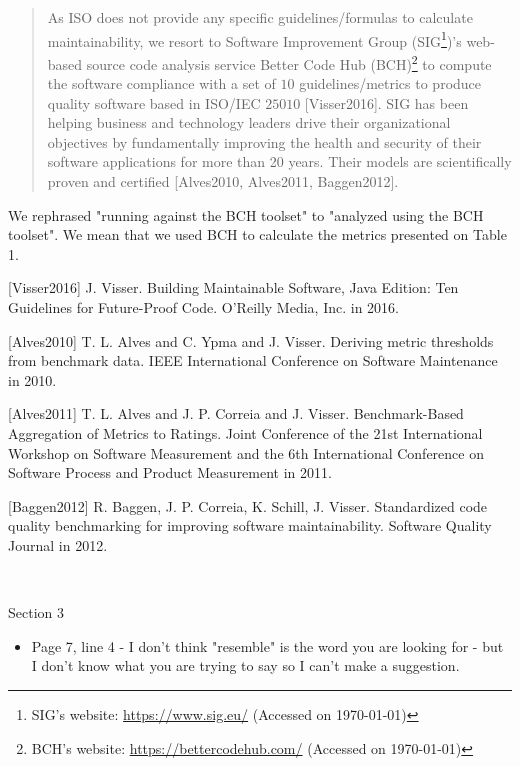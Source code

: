 \documentclass[11pt,fleqn]{article}
\newcommand{\eline}{\vspace*{.75\baselineskip}}
\newcommand{\Referee}[1]{\eline \noindent {\bf Reviewer comment #1:} \\}
\newenvironment{revcomment}[1][]
{\Referee{#1}\begin{rcomment}}
{\end{rcomment}}
\begin{document}
\begin{quote}
    As ISO does not provide any specific guidelines/formulas to 
calculate maintainability, we resort to Software Improvement Group 
(SIG\footnote{SIG's website: 
\url{https://www.sig.eu/} (Accessed on \today{})})'s web-based source 
code analysis service Better Code Hub (BCH)\footnote{BCH's 
website: \url{https://bettercodehub.com/} (Accessed on \today{})}  
to compute the software compliance with a set of $10$ 
guidelines/metrics to produce quality software based in ISO/IEC 
$25010$ [Visser2016]. SIG 
has been helping business and technology leaders drive their organizational 
objectives by fundamentally improving the health and security of 
their software applications for more than 20 years. Their 
models are scientifically proven and certified [Alves2010, Alves2011, Baggen2012].
\end{quote}

We rephrased "running against the BCH toolset" to "analyzed using the BCH toolset". We mean
that we used BCH to calculate the metrics presented on Table 1. 

[Visser2016] J. Visser. Building Maintainable Software, Java Edition: Ten Guidelines 
for Future-Proof Code. O'Reilly Media, Inc. in 2016.

[Alves2010] T. L. Alves and C. Ypma and J. Visser. Deriving metric thresholds from 
benchmark data. IEEE International Conference on Software Maintenance in 2010.

[Alves2011] T. L. Alves and J. P. Correia and J. Visser. Benchmark-Based Aggregation 
of Metrics to Ratings. Joint Conference of the 21st International Workshop on Software 
Measurement and the 6th International Conference on Software Process and Product Measurement
in 2011.

[Baggen2012] R. Baggen, J. P. Correia, K. Schill, J. Visser. Standardized code quality 
benchmarking for improving software maintainability. Software Quality Journal in 2012.


\begin{revcomment}[2.8]
    Section 3\\
    \begin{itemize}
        \item Page 7, line 4 - I don't think "resemble" is the word you are looking for - but I don't 
        know what you are trying to say so I can't make a suggestion.
    \end{itemize}
\end{revcomment}
\end{document}
